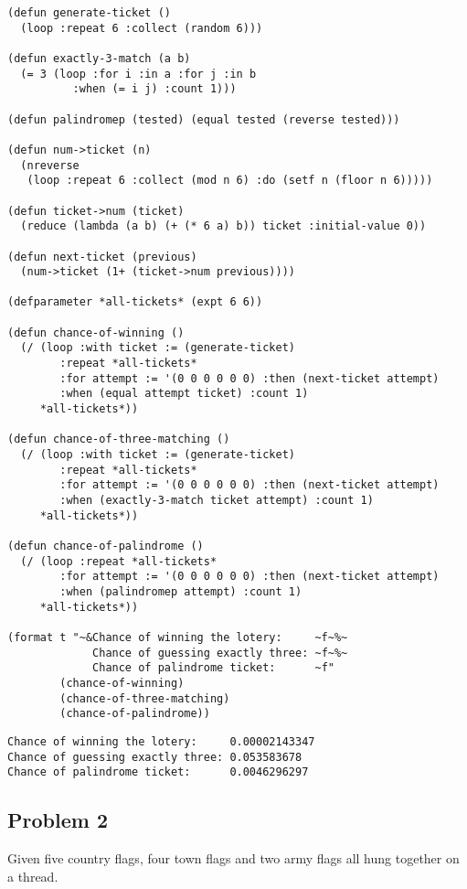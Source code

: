 \documentclass[11pt]{article}
\begin{document}
\lstset{language=Lisp,numbers=none}
\begin{lstlisting}
(defun generate-ticket ()
  (loop :repeat 6 :collect (random 6)))

(defun exactly-3-match (a b)
  (= 3 (loop :for i :in a :for j :in b
          :when (= i j) :count 1)))

(defun palindromep (tested) (equal tested (reverse tested)))

(defun num->ticket (n)
  (nreverse
   (loop :repeat 6 :collect (mod n 6) :do (setf n (floor n 6)))))

(defun ticket->num (ticket)
  (reduce (lambda (a b) (+ (* 6 a) b)) ticket :initial-value 0))

(defun next-ticket (previous)
  (num->ticket (1+ (ticket->num previous))))

(defparameter *all-tickets* (expt 6 6))

(defun chance-of-winning ()
  (/ (loop :with ticket := (generate-ticket)
        :repeat *all-tickets*
        :for attempt := '(0 0 0 0 0 0) :then (next-ticket attempt)
        :when (equal attempt ticket) :count 1)
     *all-tickets*))

(defun chance-of-three-matching ()
  (/ (loop :with ticket := (generate-ticket)
        :repeat *all-tickets*
        :for attempt := '(0 0 0 0 0 0) :then (next-ticket attempt)
        :when (exactly-3-match ticket attempt) :count 1)
     *all-tickets*))

(defun chance-of-palindrome ()
  (/ (loop :repeat *all-tickets*
        :for attempt := '(0 0 0 0 0 0) :then (next-ticket attempt)
        :when (palindromep attempt) :count 1)
     *all-tickets*))

(format t "~&Chance of winning the lotery:     ~f~%~
             Chance of guessing exactly three: ~f~%~
             Chance of palindrome ticket:      ~f"
        (chance-of-winning)
        (chance-of-three-matching)
        (chance-of-palindrome))
\end{lstlisting}

\begin{verbatim}
Chance of winning the lotery:     0.00002143347
Chance of guessing exactly three: 0.053583678
Chance of palindrome ticket:      0.0046296297
\end{verbatim}
\subsection{Problem 2}
\label{sec-1-2}
Given five country flags, four town flags and two army flags all hung
together on a thread.
\end{document}
